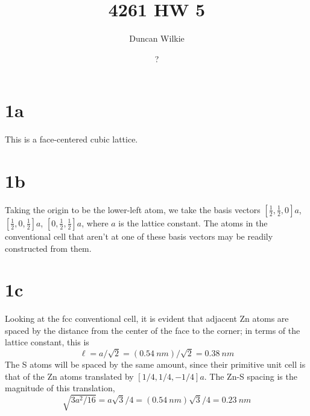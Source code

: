 \documentclass{article}
\title{4261 HW 5}
\author{Duncan Wilkie}
\date{?}
\begin{document}
\maketitle

\section*{1a}
This is a face-centered cubic lattice.

\section*{1b}
Taking the origin to be the lower-left atom, we take the basis vectors $[\frac{1}{2},\frac{1}{2},0]a$, $[\frac{1}{2},0,\frac{1}{2}]a$, $[0,\frac{1}{2},\frac{1}{2}]a$, where $a$ is the lattice constant.
The atoms in the conventional cell that aren't at one of these basis vectors may be readily constructed from them.

\section*{1c}
Looking at the fcc conventional cell, it is evident that adjacent Zn atoms are spaced by the distance from the center of the face to the corner; in terms of the lattice constant, this is
\[
  \ell=a/\sqrt{2}=(\SI{0.54}{nm})/\sqrt{2}=\SI{0.38}{nm}
\]
The S atoms will be spaced by the same amount, since their primitive unit cell is that of the Zn atoms translated by $[1/4,1/4,-1/4]a$.
The Zn-S spacing is the magnitude of this translation,
\[\sqrt{3a^{2}/16}=a\sqrt{3}/4=(\SI{0.54}{nm})\sqrt{3}/4=\SI{0.23}{nm}\]
\end{document}
